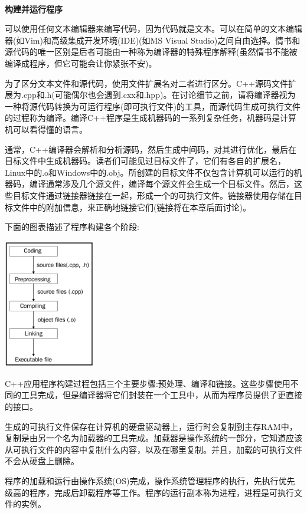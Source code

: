 \noindent\textbf{}\ \par
\textbf{构建并运行程序}\ \par
可以使用任何文本编辑器来编写代码，因为代码就是文本。可以在简单的文本编辑器(如Vim)和高级集成开发环境(IDE)(如MS Visual Studio)之间自由选择。情书和源代码的唯一区别是后者可能由一种称为编译器的特殊程序解释(虽然情书不能被编译成程序，但它可能会让你紧张不安)。\par
为了区分文本文件和源代码，使用文件扩展名对二者进行区分。C++源码文件扩展为.cpp和.h(可能偶尔也会遇到.cxx和.hpp)。在讨论细节之前，请将编译器视为一种将源代码转换为可运行程序(即可执行文件)的工具，而源代码生成可执行文件的过程称为编译。编译C++程序是生成机器码的一系列复杂任务，机器码是计算机可以看得懂的语言。 \par
通常，C++编译器会解析和分析源码，然后生成中间码，对其进行优化，最后在目标文件中生成机器码。读者们可能见过目标文件了，它们有各自的扩展名，Linux中的.o和Windows中的.obj。所创建的目标文件不仅包含计算机可以运行的机器码，编译通常涉及几个源文件，编译每个源文件会生成一个目标文件。然后，这些目标文件通过链接器链接在一起，形成一个的可执行文件。链接器使用存储在目标文件中的附加信息，来正确地链接它们(链接将在本章后面讨论)。 \par
下面的图表描述了程序构建各个阶段: \par

\begin{center}
	\includegraphics[width=0.3\textwidth]{content/Section-1/Chapter-1/1}
\end{center}

C++应用程序构建过程包括三个主要步骤:预处理、编译和链接。这些步骤使用不同的工具完成，但是编译器将它们封装在一个工具中，从而为程序员提供了更直接的接口。\par
生成的可执行文件保存在计算机的硬盘驱动器上，运行时会复制到主存RAM中，复制是由另一个名为加载器的工具完成。加载器是操作系统的一部分，它知道应该从可执行文件的内容中复制什么内容，以及在哪里复制。并且，加载的可执行文件不会从硬盘上删除。 \par
程序的加载和运行由操作系统(OS)完成，操作系统管理程序的执行，先执行优先级高的程序，完成后卸载程序等工作。程序的运行副本称为进程，进程是可执行文件的实例。 \par

